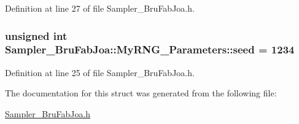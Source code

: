 Definition at line 27 of file Sampler\-\_\-\-Bru\-Fab\-Joa.\-h.

\hypertarget{struct_sampler___bru_fab_joa_1_1_my_r_n_g___parameters_aae0b56abe1943b1519648d7a0b7b2bd6}{
\subsubsection[{seed}]{\setlength{\rightskip}{0pt plus 5cm}unsigned int Sampler\-\_\-\-Bru\-Fab\-Joa\-::\-My\-R\-N\-G\-\_\-\-Parameters\-::seed = 1234}}\label{struct_sampler___bru_fab_joa_1_1_my_r_n_g___parameters_aae0b56abe1943b1519648d7a0b7b2bd6}


Definition at line 25 of file Sampler\-\_\-\-Bru\-Fab\-Joa.\-h.



The documentation for this struct was generated from the following file\-:\begin{DoxyCompactItemize}
\item 
\hyperlink{_sampler___bru_fab_joa_8h}{Sampler\-\_\-\-Bru\-Fab\-Joa.\-h}\end{DoxyCompactItemize}
